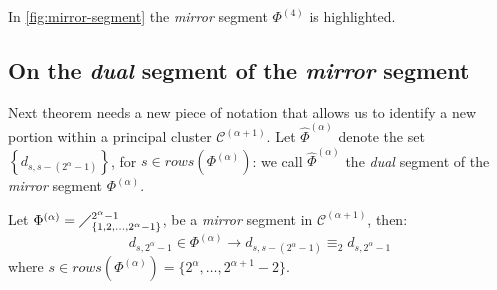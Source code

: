 
In \autoref{fig:mirror-segment} the \emph{mirror} segment $\Phi^{(4)}$ is highlighted.

\subsection{On the \emph{dual} segment of the \emph{mirror} segment}

Next theorem needs a new piece of notation that allows us to identify a
new portion within a principal cluster $\mathcal{C}^{(\alpha+1)}$.
Let $\hat{\Phi}^{(\alpha)}$ denote the set $\left\lbrace d_{s,s-(2^{\alpha}-1)}\right\rbrace$,
for $s\in rows\left(\Phi^{(\alpha)}\right)$: we call $\hat{\Phi}^{(\alpha)}$
the \emph{dual} segment of the \emph{mirror} segment $\Phi^{(\alpha)}$.

\begin{theorem}
    Let  $\Phi^{(\alpha)}=\diagup_{\lbrace 1,2,\ldots,2^{\alpha}-1\rbrace}^{2^{\alpha}-1}$,
    be a \emph{mirror} segment in $\mathcal{C}^{(\alpha+1)}$, then:
    \begin{equation}
        d_{s,2^{\alpha}-1}\in\Phi^{(\alpha)}\rightarrow d_{s,s-(2^{\alpha}-1)}\equiv_{2}d_{s,2^{\alpha}-1}
    \end{equation}
    where $s\in rows\left(\Phi^{(\alpha)}\right)=\lbrace2^{\alpha},\ldots,2^{\alpha+1}-2\rbrace$.
\end{theorem}

